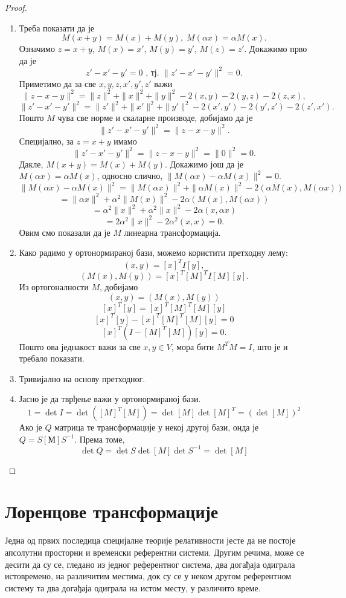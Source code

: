 \documentclass{report}
\theoremstyle{plain}
\theoremstyle{definition}
\begin{document}
\begin{proof}
\begin{enumerate}
  \item Треба показати да је
  $$M(x+y) = M(x)+M(y), \; M(\alpha x) = \alpha M(x).$$
  Означимо $z = x+y$, $M(x)=x'$, $M(y)=y'$, $M(z)=z'$. Докажимо прво да је
  $$z'-x'-y' = 0 \text{ , тј. } \|z'-x'-y'\|^2 = 0.$$
  Приметимо да за све $x, y, z, x', y', z'$ важи
  $$\|z-x-y\|^2 = \|z\|^2+\|x\|^2+\|y\|^2 - 2(x, y) -2(y, z) - 2(z, x),$$
  $$\|z'-x'-y'\|^2 = \|z'\|^2+\|x'\|^2+\|y'\|^2 - 2(x', y') -2(y', z') - 2(z', x').$$
  Пошто $M$ чува све норме и скаларне производе, добијамо да је
  $$\|z'-x'-y'\|^2 = \|z-x-y\|^2.$$
  Специјално, за $z=x+y$ имамо
  $$\|z'-x'-y'\|^2 = \|z-x-y\|^2 = \|0\|^2 = 0.$$
  Дакле, $M(x+y) = M(x)+M(y)$. Докажимо још да је $M(\alpha x) = \alpha M(x)$, односно слично, $\|M(\alpha x) - \alpha M(x)\|^2 = 0$.
  $$\|M(\alpha x) - \alpha M(x)\|^2 = \|M(\alpha x)\|^2 + \|\alpha M(x)\|^2 - 2(\alpha M(x), M(\alpha x))$$
  $$ = \|\alpha x\|^2 + \alpha^2 \|M(x)\|^2 - 2\alpha(M(x), M(\alpha x))$$
  $$ = \alpha^2\|x\|^2 + \alpha^2 \|x\|^2 - 2\alpha(x, \alpha x)$$
  $$ = 2\alpha^2\|x\|^2 - 2\alpha^2 (x, x) = 0.$$
  Овим смо показали да је $M$ линеарна трансформација.
  \item Како радимо у ортонормираној бази, можемо користити претходну лему:  
  $$(x, y) = [x]^TI[y],$$
  $$(M(x), M(y)) = [x]^T[M]^TI[M][y].$$
  Из ортогоналности $M$, добијамо 
  $$(x, y) = (M(x), M(y))$$
  $$[x]^T[y] = [x]^T[M]^T[M][y]$$
  $$[x]^T[y] - [x]^T[M]^T[M][y] = 0$$
  $$[x]^T(I-[M]^T[M])[y] = 0.$$
  Пошто ова једнакост важи за све $x, y\in V$, мора бити $M^TM = I$, што је и требало показати.
  \item Тривијално на основу претходног.
  \item Јасно је да тврђење важи у ортонормираној бази. 
  $$1 = \det I = \det([M]^T[M]) = \det [M] \det {[M]^T} = (\det [M])^2$$
  Ако је $Q$ матрица те трансформације у некој другој бази, онда је $Q = S[М]S^{-1}$. Према томе, 
  $$\det Q = \det S \det [M] \det S^{-1} = \det [M]$$
\end{enumerate}
\end{proof}

\section{Лоренцове трансформације}

Једна од првих последица специјалне теорије релативности јесте да не постоје апсолутни просторни и временски референтни системи. Другим речима, може се десити да су се, гледано из једног референтног система, два догађаја одиграла истовремено, на различитим местима, док су се у неком другом референтном систему та два догађаја одиграла на истом месту, у различито време.
\end{document}
